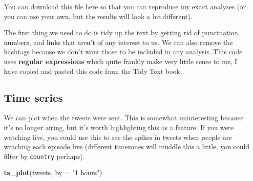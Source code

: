 \documentclass[]{book}
\newenvironment{Shaded}{\begin{snugshade}}{\end{snugshade}}
\newcommand{\CharTok}[1]{\textcolor[rgb]{0.31,0.60,0.02}{#1}}
\newcommand{\DataTypeTok}[1]{\textcolor[rgb]{0.13,0.29,0.53}{#1}}
\newcommand{\KeywordTok}[1]{\textcolor[rgb]{0.13,0.29,0.53}{\textbf{#1}}}
\newcommand{\NormalTok}[1]{#1}
\newcommand{\OperatorTok}[1]{\textcolor[rgb]{0.81,0.36,0.00}{\textbf{#1}}}
\newcommand{\StringTok}[1]{\textcolor[rgb]{0.31,0.60,0.02}{#1}}
\begin{document}
You can download this file here so that you can reproduce my exact analyses (or you can use your own, but the results will look a bit different).

The first thing we need to do is tidy up the text by getting rid of punctuation, numbers, and links that aren't of any interest to us. We can also remove the hashtags because we don't want those to be included in any analysis. This code uses \textbf{regular expressions} which quite frankly make very little sense to me, I have copied and pasted this code from the Tidy Text book.

\begin{Shaded}
\end{Shaded}

\hypertarget{time-series}{%
\subsection{Time series}\label{time-series}}

We can plot when the tweets were sent. This is somewhat uninteresting because it's no longer airing, but it's worth highlighting this as a feature. If you were watching live, you could use this to see the spikes in tweets when people are watching each episode live (different timezones will muddle this a little, you could filter by \texttt{country} perhaps).

\begin{Shaded}
\begin{Highlighting}[]
\KeywordTok{ts_plot}\NormalTok{(tweets, }\DataTypeTok{by =} \StringTok{"1 hours"}\NormalTok{)}
\end{Highlighting}
\end{Shaded}
\end{document}
